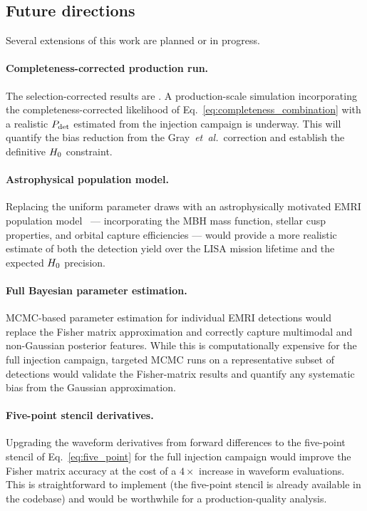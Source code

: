 \subsection{Future directions}
\label{sec:future}

Several extensions of this work are planned or in progress.

\paragraph{Completeness-corrected production run.}
The selection-corrected results are .  A production-scale simulation incorporating the
completeness-corrected likelihood of
Eq.~\eqref{eq:completeness_combination} with a realistic $P_\mathrm{det}$
estimated from the injection campaign is underway.  This will quantify
the bias reduction from the Gray~\emph{et~al.}\ correction and
establish the definitive $H_0$ constraint.

\paragraph{Astrophysical population model.}
Replacing the uniform parameter draws with an astrophysically motivated
EMRI population model~\cite{Babak:2017tow} --- incorporating the MBH
mass function, stellar cusp properties, and orbital capture
efficiencies --- would provide a more realistic estimate of both the
detection yield over the LISA mission lifetime and the expected $H_0$
precision.

\paragraph{Full Bayesian parameter estimation.}
MCMC-based parameter estimation for individual EMRI detections would
replace the Fisher matrix approximation and correctly capture multimodal
and non-Gaussian posterior features.  While this is computationally
expensive for the full injection campaign, targeted MCMC runs on a
representative subset of detections would validate the Fisher-matrix
results and quantify any systematic bias from the Gaussian
approximation.

\paragraph{Five-point stencil derivatives.}
Upgrading the waveform derivatives from forward differences to the
five-point stencil of Eq.~\eqref{eq:five_point} for the full injection
campaign would improve the Fisher matrix accuracy at the cost of a
$4\times$ increase in waveform evaluations.  This is straightforward to
implement (the five-point stencil is already available in the codebase)
and would be worthwhile for a production-quality analysis.

